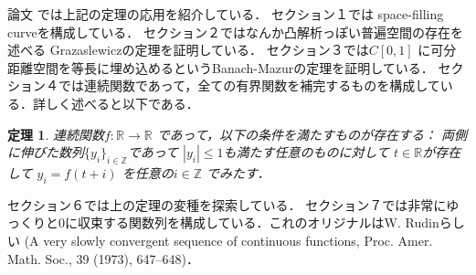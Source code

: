 \documentclass[leqno, a4paper, 12pt]{jsarticle}
\newtheorem{thm}{定理}
\newcommand{\zz}{\mathbb{Z}}
\newcommand{\rr}{\mathbb{R}}
\begin{document}
論文
\cite{MR1650866}
では上記の定理の応用を紹介している．
セクション１では
space-filling curveを構成している．
セクション２ではなんか凸解析っぽい普遍空間の存在を述べる
Grazaslewiczの定理を証明している．
セクション３では$C[0, 1]$
に可分距離空間を等長に埋め込めるというBanach-Mazurの定理を証明している．
セクション４では連続関数であって，全ての有界関数を補完するものを構成している．詳しく述べると以下である．
\begin{thm}
連続関数$f\colon \rr\to \rr$
であって，以下の条件を満たすものが存在する：
両側に伸びた数列$\{y_{i}\}_{i\in \zz}$であって
$|y_{i}|\le 1$も満たす任意のものに対して
$t\in \rr$が存在して 
$y_{i}=f(t+i)$
を任意の$i\in \zz$
でみたす．
\end{thm}
セクション６では上の定理の変種を探索している．
セクション７では非常にゆっくりと$0$に収束する関数列を構成している．これのオリジナルはW. Rudinらしい
(A very slowly convergent sequence of continuous functions, Proc. Amer. Math. Soc., 39 (1973), 647--648)．

\nocite{*}


\end{document}
